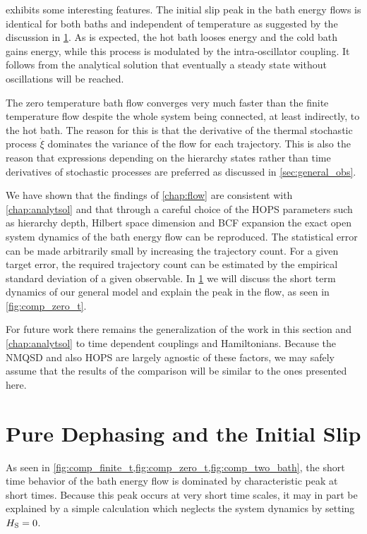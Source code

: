  exhibits some interesting features. The
initial slip peak in the bath energy flows is identical for both baths
and independent of temperature as suggested by the discussion in
\cref{sec:pure_deph}. As is expected, the hot bath looses energy and
the cold bath gains energy, while this process is modulated by the
intra-oscillator coupling. It follows from the analytical solution
that eventually a steady state without oscillations will be reached.

The zero temperature bath flow converges very much faster than the
finite temperature flow despite the whole system being connected, at
least indirectly, to the hot bath. The reason for this is that the
derivative of the thermal stochastic process \(\dot{ξ}\) dominates the
variance of the flow for each trajectory. This is also the reason that
expressions depending on the hierarchy states rather than time
derivatives of stochastic processes are preferred as discussed in
\cref{sec:general_obs}.

We have shown that the findings of \cref{chap:flow} are consistent
with \cref{chap:analytsol} and that through a careful choice of the
HOPS parameters such as hierarchy depth, Hilbert space dimension and
BCF expansion the exact open system dynamics of the bath energy flow
can be reproduced. The statistical error can be made arbitrarily small
by increasing the trajectory count. For a given target error, the
required trajectory count can be estimated by the empirical standard
deviation of a given observable. In \cref{sec:pure_deph} we will
discuss the short term dynamics of our general model and explain the
peak in the flow, as seen in \cref{fig:comp_zero_t}.

For future work there remains the generalization of the work in this
section and \cref{chap:analytsol} to time dependent couplings and
Hamiltonians. Because the NMQSD and also HOPS are largely agnostic of
these factors, we may safely assume that the results of the comparison
will be similar to the ones presented here.

\section{Pure Dephasing and the Initial Slip}
\label{sec:pure_deph}
As seen in \cref{fig:comp_finite_t,fig:comp_zero_t,fig:comp_two_bath},
the short time behavior of the bath energy flow is dominated by
characteristic peak at short times. Because this peak occurs at very
short time scales, it may in part be explained by a simple calculation
which neglects the system dynamics by setting \(H_{\mathrm{S}}=0\).

